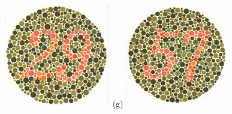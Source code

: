 \documentclass[	12pt, Times, openright, twoside, a4paper, english, brazil]{abntex2}
\begin{document}
\begin{apendicesenv}
\begin{figure}[!htb]
\centering
{\includegraphics[width=\linewidth]{ishihara-transformacao/figureIshihara4.png}}
(g)
\endminipage\hfill
{}
\centering
{\includegraphics[width=\linewidth]{ishihara-transformacao/figureIshihara5.png}}

\end{figure}
\end{apendicesenv}
\end{document}
